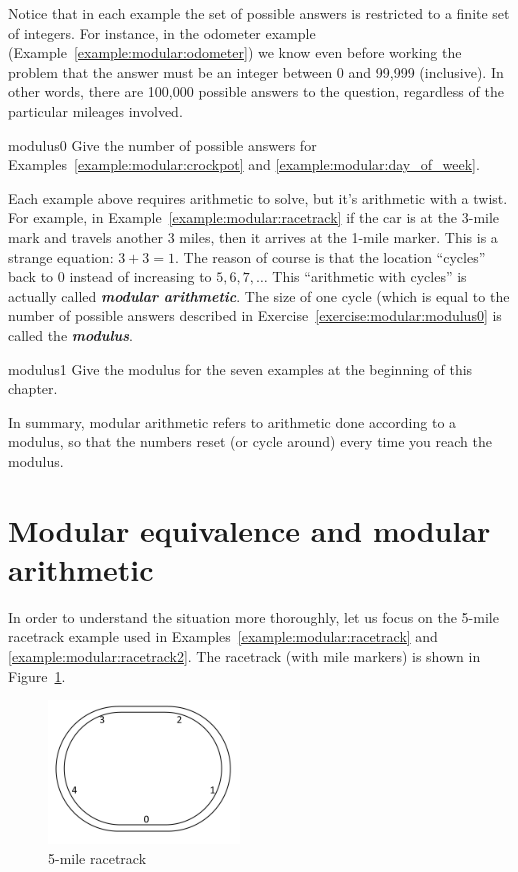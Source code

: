 Notice that in each example the set of possible answers is restricted to a finite set of integers. For instance, in the odometer example (Example~\ref{example:modular:odometer}) we know even before working the problem that the answer must be an integer between 0 and 99,999 (inclusive). In other words, there are 100,000 possible answers to the question, regardless of the particular mileages involved. 

\begin{exercise}{modulus0}
Give the number of possible answers for Examples~\ref{example:modular:crockpot} and \ref{example:modular:day_of_week}.
\end{exercise}

Each example above requires arithmetic to solve, but it's arithmetic with a twist. For example, in
Example~\ref{example:modular:racetrack} if the car is at the 3-mile mark and travels another 3 miles, then it arrives at the 1-mile marker. This is a strange equation: $3 + 3 = 1$. The reason of course is that the location ``cycles'' back to 0 instead of increasing to $5,6,7, \ldots$ This  ``arithmetic with cycles''  is actually called \textbf{\emph{modular arithmetic}}.  The size of one cycle (which is equal to the number of possible answers described in Exercise~\ref{exercise:modular:modulus0} is called the \textbf{\emph{modulus}}.  

\begin{exercise}{modulus1}
Give the modulus for the seven examples at the beginning of this chapter.
\end{exercise}

In summary, modular arithmetic refers to  arithmetic done according to a modulus, so that the numbers reset (or cycle around) every time you reach the modulus.

\section{Modular equivalence and modular arithmetic}\label{sec:ModEquiv}

In order to understand the situation more thoroughly, let us focus on the 5-mile racetrack example used in Examples~\ref{example:modular:racetrack} and \ref{example:modular:racetrack2}. The racetrack (with mile markers) is shown in Figure~\ref{fig:racetrack}. 
\begin{figure}[h]
\begin{center}
\includegraphics[width=2in]{images/racetrack.png}
\end{center}
\caption{5-mile racetrack}\label{fig:racetrack}
\end{figure}

